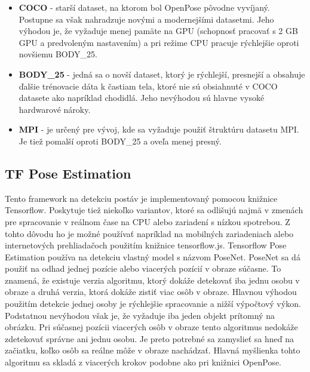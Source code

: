 \documentclass[slovak,master,dept460,male,cpp,cpdeclaration]{diploma}
\begin{document}
\begin{itemize}
\item \textbf{COCO} - starší dataset, na ktorom bol OpenPose pôvodne vyvíjaný. Postupne sa však nahradzuje novými a modernejšími datasetmi. Jeho výhodou je, že vyžaduje menej pamäte na GPU (schopnosť pracovať s 2 GB GPU a predvoleným nastavením) a pri režime CPU pracuje rýchlejšie oproti novšiemu BODY\_25.

\item \textbf{BODY\_25} - jedná sa o novší dataset, ktorý je rýchlejší, presnejší a obsahuje ďalšie trénovacie dáta k častiam tela, ktoré nie sú obsiahnuté v COCO datasete ako napríklad chodidlá. Jeho nevýhodou sú hlavne vysoké hardwarové nároky.

\item \textbf{MPI} - je určený pre vývoj, kde sa vyžaduje použiť štruktúru datasetu MPI. Je tiež pomalší oproti BODY\_25 a oveľa menej presný.
\end{itemize}


\newpage
\subsection{TF Pose Estimation}
Tento framework na detekciu postáv je implementovaný pomocou knižnice Tensorflow. Poskytuje tiež niekoľko variantov, ktoré sa odlišujú najmä v zmenách pre spracovanie v reálnom čase na CPU alebo zariadení s nízkou spotrebou. Z tohto dôvodu ho je  možné používať napríklad na mobilných zariadeniach alebo internetových prehliadačoch použitím knižnice tensorflow.js. Tensorflow Pose Estimation používa na detekciu  vlastný model s názvom PoseNet. PoseNet sa dá použiť na odhad jednej pozície alebo viacerých pozícií v obraze súčasne. To znamená, že existuje verzia algoritmu, ktorý dokáže detekovať iba jednu osobu v obraze a druhá verzia, ktorá dokáže zistiť viac osôb v obraze. Hlavnou výhodou použitím detekcie jednej osoby je rýchlejšie spracovanie a nižší výpočtový výkon. Podstatnou nevýhodou však je, že vyžaduje iba jeden objekt prítomný na obrázku. Pri súčasnej pozícii viacerých osôb v obraze tento algoritmus nedokáže zdetekovať správne ani jednu osobu. Je preto potrebné sa zamyslieť sa  hneď na začiatku, koľko osôb sa reálne môže v obraze nachádzať. Hlavná myšlienka tohto algoritmu sa skladá z viacerých krokov podobne ako pri knižnici OpenPose.
\end{document}

